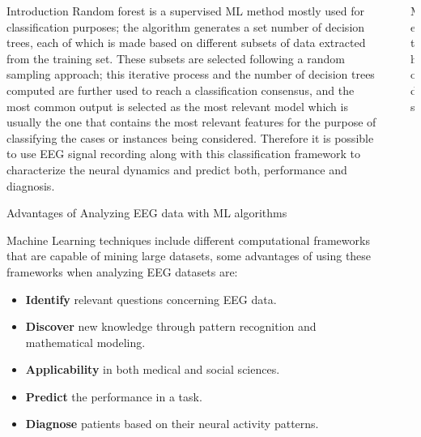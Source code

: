 \documentclass[final]{beamer}
\newlength{\sepwidth}
\newlength{\colwidth}
\newcommand{\separatorcolumn}{\begin{column}{\sepwidth}\end{column}}
\begin{document}
\begin{frame}[t]
\begin{columns}[t]
\begin{column}{\colwidth}
\begin{block}{Introduction}
    Random forest is a supervised ML method mostly used for classification purposes; the algorithm generates a set number of decision trees, each of which is made based on different subsets of data extracted from the training set. These subsets are selected following a random sampling approach; this iterative process  and the number of decision trees computed are further used to reach a classification consensus, and the most common output is selected as the most relevant model which is usually the one that contains the most relevant features for the purpose of classifying the cases or instances being considered. Therefore it is possible to use EEG signal recording along with this classification framework to characterize the neural dynamics and predict both, performance and diagnosis.

  \end{block}

  \begin{block}{Advantages of Analyzing EEG data with ML algorithms}

  Machine Learning techniques include different computational frameworks that are capable of mining large datasets, some advantages of using these frameworks when analyzing EEG datasets are:

    \begin{itemize}
      \item \textbf{Identify} relevant questions concerning EEG data.
      \item \textbf{Discover} new knowledge through pattern recognition and mathematical modeling.
      \item \textbf{Applicability} in both medical and social sciences.
      \item \textbf{Predict} the performance in a task.
      \item \textbf{Diagnose} patients based on their neural activity patterns.
    \end{itemize}
  \end{block}

\end{column}

\separatorcolumn

\begin{column}{\colwidth}

  \begin{block}{Methods}


\end{block}
\end{column}
\end{columns}
\end{frame}
\end{document}
